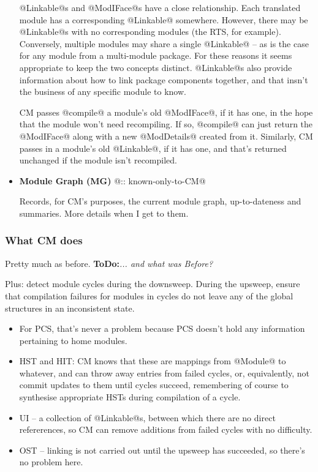 \documentclass[11pt]{article}
\newcommand{\ToDo}[1]{{{\bf ToDo:}\sl #1}}
\begin{document}
\begin{itemize}
   @Linkable@s and @ModIFace@s have a close relationship.  Each
   translated module has a corresponding @Linkable@ somewhere.
   However, there may be @Linkable@s with no corresponding modules
   (the RTS, for example).  Conversely, multiple modules may share a
   single @Linkable@ -- as is the case for any module from a
   multi-module package.  For these reasons it seems appropriate to
   keep the two concepts distinct.  @Linkable@s also provide
   information about how to link package components together, and that
   insn't the business of any specific module to know.

   CM passes @compile@ a module's old @ModIFace@, if it has one, in
   the hope that the module won't need recompiling.  If so, @compile@
   can just return the @ModIFace@ along with a new @ModDetails@
   created from it.  Similarly, CM passes in a module's old
   @Linkable@, if it has one, and that's returned unchanged if the
   module isn't recompiled.

\item 
   {\bf Module Graph (MG)} @:: known-only-to-CM@

   Records, for CM's purposes, the current module graph,
   up-to-dateness and summaries.  More details when I get to them.
\end{itemize}


\subsubsection{What CM does}
Pretty much as before.  \ToDo{... and what was Before?}

Plus: detect module cycles during the downsweep.  During the upsweep,
ensure that compilation failures for modules in cycles do not leave
any of the global structures in an inconsistent state.  
\begin{itemize}
\item 
   For PCS, that's never a problem because PCS doesn't hold any
   information pertaining to home modules.
\item 
   HST and HIT: CM knows that these are mappings from @Module@ to
   whatever, and can throw away entries from failed cycles, or,
   equivalently, not commit updates to them until cycles succeed,
   remembering of course to synthesise appropriate HSTs during
   compilation of a cycle.
\item 
   UI -- a collection of @Linkable@s, between which there are no
   direct refererences, so CM can remove additions from failed cycles
   with no difficulty.
\item 
   OST -- linking is not carried out until the upsweep has
   succeeded, so there's no problem here.
\end{itemize}
\end{document}
